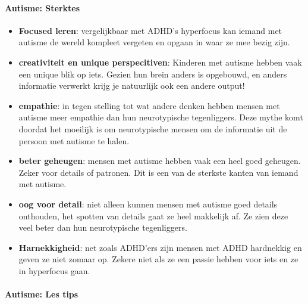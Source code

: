 \documentclass{article}
\begin{document}
                \bigskip
                \noindent\paragraph{Autisme: Sterktes}
                    \begin{itemize}
                        \item \textbf{Focused leren}\cite{autisme-upsides}: 
                            vergelijkbaar met ADHD's hyperfocus kan iemand met autisme de wereld kompleet vergeten en opgaan in waar ze mee bezig zijn.
                        \item \textbf{creativiteit en unique perspecitiven}\cite{autisme-upsides}:
                            Kinderen met autisme hebben vaak een unique blik op iets. Gezien hun brein anders is opgebouwd, en anders informatie verwerkt krijg je natuurlijk ook een andere output!
                        \item \textbf{empathie}\cite{autisme-upsides}: 
                            in tegen stelling tot wat andere denken hebben mensen met autisme meer empathie dan hun neurotypische tegenliggers. Deze mythe komt doordat het moeilijk is om neurotypische mensen om de informatie uit de persoon met autisme te halen.
                        \item \textbf{beter geheugen}\cite{autisme-upsides}: 
                            mensen met autisme hebben vaak een heel goed geheugen. Zeker voor details of patronen. Dit is een van de sterkste kanten van iemand met autisme.
                        \item \textbf{oog voor detail}\cite{autisme-upsides}: 
                            niet alleen kunnen mensen met autisme goed details onthouden, het spotten van details gaat ze heel makkelijk af. Ze zien deze veel beter dan hun neurotypische tegenliggers.
                        \item \textbf{Harnekkigheid}\cite{autisme-upsides}:
                            net zoals ADHD'ers zijn mensen met ADHD hardnekkig en geven ze niet zomaar op. Zekere niet als ze een passie hebben voor iets en ze in hyperfocus gaan.
                    \end{itemize}                    
                 \bigskip
                 \noindent\paragraph{Autisme: Les tips}
\end{document}
